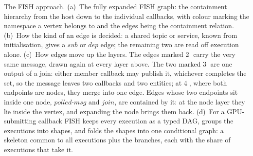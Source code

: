 \caption{The FISH approach. (a)~The fully expanded FISH graph: the containment
hierarchy from the host down to the individual callbacks, with colour marking
the namespace a vertex belongs to and the edges being the containment relation.
(b)~How the kind of an edge is decided: a shared topic or service, known from
initialisation, gives a $\mathit{sub}$ or $\mathit{dep}$ edge; the remaining two
are read off execution alone. (c)~How edges move up the layers. The edges marked
\textcircled{\scriptsize 2} carry the very same message, drawn again at every
layer above. The two marked \textcircled{\scriptsize 3} are one output of a join:
either member callback may publish it, whichever completes the set, so the
message leaves two callbacks and two entities; at \textcircled{\scriptsize 4},
where both endpoints are nodes, they merge into one edge. Edges whose two
endpoints sit inside one node, $\mathit{polled\text{-}msg}$ and
$\mathit{join}$, are contained by it: at the node layer they lie inside the
vertex, and expanding the node brings them back. (d)~For a GPU-submitting
callback FISH keeps every execution as a typed DAG, groups the executions into
shapes, and folds the shapes into one conditional graph: a skeleton common to
all executions plus the branches, each with the share of executions that take
it.}
